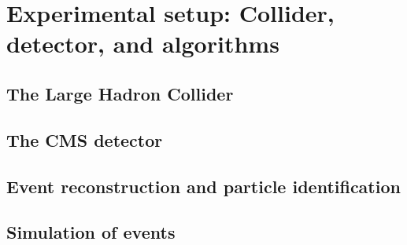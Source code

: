 \chapter{Experimental setup: Collider, detector, and algorithms}

\section{The Large Hadron Collider}

\section{The CMS detector}

\section{Event reconstruction and particle identification}

\section{Simulation of events}